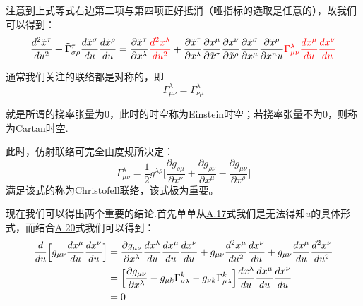 \documentclass[a4paper]{book}
\begin{document}
\begin{appendix}
\begin{equation}
\end{equation} \par 
注意到上式等式右边第二项与第四项正好抵消（哑指标的选取是任意的），故我们可以得到：
\begin{equation}
	\frac{d^2 \tilde{x}^{\tau}}{du^2}+\tilde{\Gamma}^{\tau}_{\sigma \rho}\frac{d\tilde{x}^{\sigma}}{du}\frac{d\tilde{x}^{\rho}}{du}=\frac{\partial \tilde{x}^{\tau}}{\partial x^{\lambda}}\textcolor{red}{\frac{d^2   x^{\lambda}}{du^2}}+\frac{\partial \tilde{x}^{\tau}}{\partial x^{\lambda}}\frac{\partial x^{\mu}}{\partial \tilde{x}^{\sigma}}\frac{\partial x^{\nu}}{\partial \tilde{x}^{\rho}}\frac{\partial \tilde{x}^{\sigma}}{\partial x^{\mu}}\frac{\partial \tilde{x}^{\rho}}{\partial x^nu}\textcolor{red}{\Gamma^{\lambda}_{\mu \nu}\frac{dx^{\mu}}{du}\frac{dx^{\nu}}{du}}
\end{equation}\par 
通常我们关注的联络都是对称的，即
\begin{equation}\label{A.19}
	\Gamma^{\lambda}_{\mu \nu}=\Gamma^{\lambda}_{\nu \mu}
\end{equation}\par 
就是所谓的挠率张量为0，此时的时空称为Einstein时空；若挠率张量不为0，则称为Cartan时空.\par 
此时，仿射联络可完全由度规所决定：
\begin{equation}\label{A.20}
		\Gamma^{\lambda}_{\mu \nu}=\frac{1}{2} g^{\lambda \rho}\Big[\frac{\partial g_{\rho \mu}}{\partial x^{\nu}}+\frac{\partial g_{\rho \nu}}{\partial x^{\mu}}-\frac{\partial g_{\mu \nu}}{\partial x^{\rho}}\Big]
\end{equation}
满足该式的称为Christofell联络，该式极为重要。\par 
现在我们可以得出两个重要的结论.首先单单从\hyperref[A.17]{A.17}式我们是无法得知$u$的具体形式，而结合\hyperref[A.20]{A.20}式我们可以得到：
\begin{align}
  \frac{d}{du}\Big[g_{\mu \nu}\frac{dx^{\mu}}{du}\frac{dx^{\nu}}{du}\Big]={} & \frac{\partial g_{\mu \nu}}{\partial x^{\lambda}}\frac{dx^{\lambda}}{du}\frac{dx^{\mu}}{du}\frac{dx^{\nu}}{du}+g_{\mu \nu}\frac{d^2x^{\mu}}{du^2}\frac{dx^{\nu}}{du}+g_{\mu \nu}\frac{dx^{\mu}}{du}\frac{d^2x^{\nu}}{du^2} \notag \\
  ={} & \Big[\frac{\partial g_{\mu \nu}}{\partial x^{\lambda}}-g_{\mu k}\Gamma^{k}_{\nu \lambda}-g_{\nu k}\Gamma^{k}_{\mu \lambda}\Big]\frac{dx^{\lambda}}{du}\frac{dx^{\mu}}{du}\frac{dx^{\nu}}{du}\notag \\
  ={} & 0 \notag
\end{align}\par 

\end{appendix}
\end{document}
